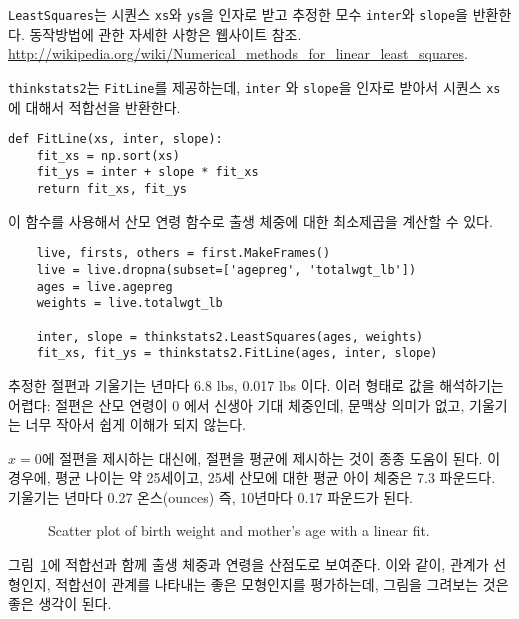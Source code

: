 {\tt LeastSquares}는 시퀀스 {\tt xs}와 {\tt ys}을 인자로 받고 추정한 모수 {\tt inter}와
{\tt slope}을 반환한다. 동작방법에 관한 자세한 사항은 웹사이트 참조. \url{http://wikipedia.org/wiki/Numerical_methods_for_linear_least_squares}.


{\tt thinkstats2}는 {\tt FitLine}를 제공하는데, {\tt inter} 와 {\tt slope}을 인자로 받아서 시퀀스 {\tt xs}에 대해서 적합선을 반환한다.

\begin{verbatim}
def FitLine(xs, inter, slope):
    fit_xs = np.sort(xs)
    fit_ys = inter + slope * fit_xs
    return fit_xs, fit_ys
\end{verbatim}

이 함수를 사용해서 산모 연령 함수로 출생 체중에 대한 최소제곱을 계산할 수 있다.

\begin{verbatim}
    live, firsts, others = first.MakeFrames()
    live = live.dropna(subset=['agepreg', 'totalwgt_lb'])
    ages = live.agepreg
    weights = live.totalwgt_lb

    inter, slope = thinkstats2.LeastSquares(ages, weights)
    fit_xs, fit_ys = thinkstats2.FitLine(ages, inter, slope)
\end{verbatim}

추정한 절편과 기울기는 년마다 6.8 lbs, 0.017 lbs 이다.
이러 형태로 값을 해석하기는 어렵다: 절편은 산모 연령이 0 에서 신생아 기대 체중인데,
문맥상 의미가 없고, 기울기는 너무 작아서 쉽게 이해가 되지 않는다.


$x=0$에 절편을 제시하는 대신에, 절편을 평균에 제시하는 것이 종종 도움이 된다.
이 경우에, 평균 나이는 약 25세이고, 25세 산모에 대한 평균 아이 체중은 7.3 파운드다.
기울기는 년마다 0.27 온스(ounces) 즉, 10년마다 0.17 파운드가 된다.

\begin{figure}
\caption{Scatter plot of birth weight and mother's age with
a linear fit.}
\label{linear1}
\end{figure}

그림~\ref{linear1}에 적합선과 함께 출생 체중과 연령을 산점도로 보여준다.
이와 같이, 관계가 선형인지, 적합선이 관계를 나타내는 좋은 모형인지를 평가하는데, 그림을 그려보는 것은 좋은 생각이 된다. 




